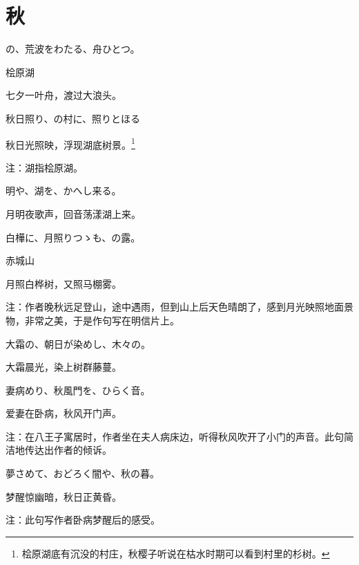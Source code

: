 \section{\FK 秋}

\setcounter{haikucounter}{0}

\begin{haiku}
    {\FH {}の、荒波をわたる、舟ひとつ。}

    {\FK 桧原湖}

    {\FK 七夕一叶舟，渡过大浪头。}
\end{haiku}

\begin{haiku}
    {\FH 秋日照り、の村に、照りとほる }

    {\FK 秋日光照映，浮现湖底树景。\footnote{\FT 桧原湖底有沉没的村庄，秋樱子听说在枯水时期可以看到村里的杉树。}}

    {\FT 注：湖指桧原湖。}
\end{haiku}

\begin{haiku}
    {\FH {}明や、湖を、かへし来る。}

    {\FK 月明夜歌声，回音荡漾湖上来。}
\end{haiku}

\begin{haiku}
    {\FH 白樺に、月照りつゝも、の露。}

    {\FK 赤城山}

    {\FK 月照白桦树，又照马棚雾。}

    {\FT 注：作者晚秋远足登山，途中遇雨，但到山上后天色晴朗了，感到月光映照地面景物，非常之美，于是作句写在明信片上。}
\end{haiku}

\begin{haiku}
    {\FH 大霜の、朝日が染めし、木々の。}

    {\FK 大霜晨光，染上树群藤蔓。}
\end{haiku}

\begin{haiku}
    {\FH 妻病めり、秋風門を、ひらく音。}

    {\FK 爱妻在卧病，秋风开门声。}

    {\FT 注：在八王子寓居时，作者坐在夫人病床边，听得秋风吹开了小门的声音。此句简洁地传达出作者的倾诉。}
\end{haiku}

\begin{haiku}
    {\FH 夢さめて、おどろく闇や、秋の暮。}

    {\FK 梦醒惊幽暗，秋日正黄昏。}

    {\FT 注：此句写作者卧病梦醒后的感受。}
\end{haiku}

